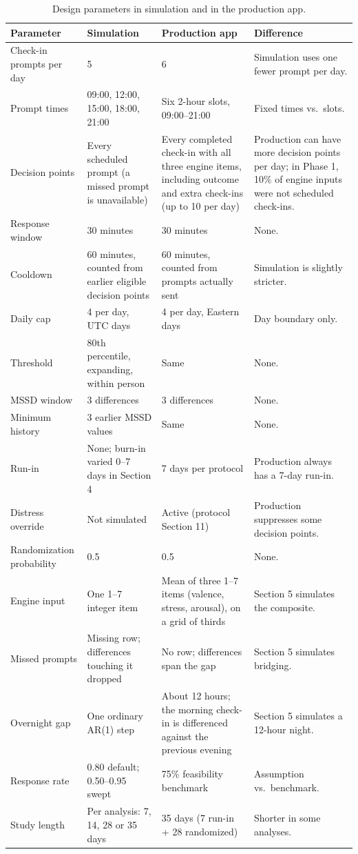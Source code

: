 \documentclass[11pt,letterpaper]{article}
\begin{document}
\begin{table}[htbp]
\centering
\small
\begin{tabular}{@{}p{2.9cm}p{3.4cm}p{3.6cm}p{4.3cm}@{}}
\toprule
\textbf{Parameter} & \textbf{Simulation} & \textbf{Production app} & \textbf{Difference} \\
\midrule
Check-in prompts per day & 5 & 6 & Simulation uses one fewer prompt per day. \\
Prompt times & 09:00, 12:00, 15:00, 18:00, 21:00 & Six 2-hour slots, 09:00--21:00 & Fixed times vs.\ slots. \\
Decision points & Every scheduled prompt (a missed prompt is unavailable) & Every completed check-in with all three engine items, including outcome and extra check-ins (up to 10 per day) & Production can have more decision points per day; in Phase 1, 10\% of engine inputs were not scheduled check-ins. \\
Response window & 30 minutes & 30 minutes & None. \\
Cooldown & 60 minutes, counted from earlier eligible decision points & 60 minutes, counted from prompts actually sent & Simulation is slightly stricter. \\
Daily cap & 4 per day, UTC days & 4 per day, Eastern days & Day boundary only. \\
Threshold & 80th percentile, expanding, within person & Same & None. \\
MSSD window & 3 differences & 3 differences & None. \\
Minimum history & 3 earlier MSSD values & Same & None. \\
Run-in & None; burn-in varied 0--7 days in Section 4 & 7 days per protocol & Production always has a 7-day run-in. \\
Distress override & Not simulated & Active (protocol Section 11) & Production suppresses some decision points. \\
Randomization probability & 0.5 & 0.5 & None. \\
Engine input & One 1--7 integer item & Mean of three 1--7 items (valence, stress, arousal), on a grid of thirds & Section 5 simulates the composite. \\
Missed prompts & Missing row; differences touching it dropped & No row; differences span the gap & Section 5 simulates bridging. \\
Overnight gap & One ordinary AR(1) step & About 12 hours; the morning check-in is differenced against the previous evening & Section 5 simulates a 12-hour night. \\
Response rate & 0.80 default; 0.50--0.95 swept & 75\% feasibility benchmark & Assumption vs.\ benchmark. \\
Study length & Per analysis: 7, 14, 28 or 35 days & 35 days (7 run-in + 28 randomized) & Shorter in some analyses. \\
\bottomrule
\end{tabular}
\caption{Design parameters in simulation and in the production app.}
\label{tab:params}
\end{table}
\end{document}
